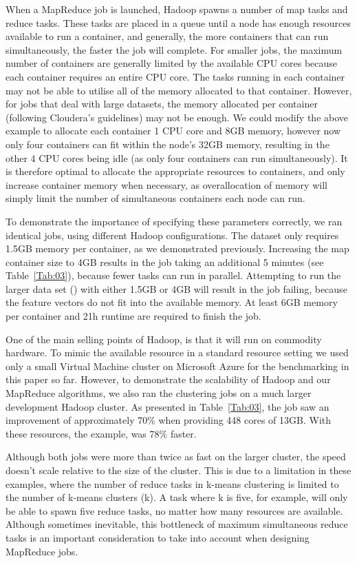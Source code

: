 \documentclass{bioinfo}
\begin{document}
When a MapReduce job is launched, Hadoop spawns a number of map tasks and reduce tasks. 
These tasks are placed in a queue until a node has enough resources available to run a container, and generally, the more containers that can run simultaneously, the faster the job will complete.
For smaller jobs, the maximum number of containers are generally limited by the available CPU cores because each container requires an entire CPU core. The tasks running in each container may not be able to utilise all of the memory allocated to that container.
However, for jobs that deal with large datasets, the memory allocated per container (following Cloudera's guidelines) may not be enough.
We could modify the above example to allocate each container 1 CPU core and 8GB memory, however now only four containers can fit within the node's 32GB memory, resulting in the other 4 CPU cores being idle (as only four containers can run simultaneously). 
It is therefore optimal to allocate the appropriate resources to containers, and only increase container memory when necessary, as overallocation of memory will simply limit the number of simultaneous containers each node can run.

To demonstrate the importance of specifying these parameters correctly, we ran identical jobs, using different Hadoop configurations. 
The \OnePhaseone{} dataset only requires 1.5GB memory per container, as we demonstrated previously.
Increasing the map container size to 4GB results in the job taking an additional 5 minutes (see Table~\ref{Tab:03}), because fewer tasks can run in parallel. 
Attempting to run the larger data set (\FullPhasethree{}) with either 1.5GB or 4GB will result in the job failing, because the feature vectors do not fit into the available memory. 
At least 6GB memory per container and 21h runtime are required to finish the job. 

One of the main selling points of Hadoop, is that it will run on commodity hardware. 
To mimic the available resource in a standard resource setting we used only a small Virtual Machine cluster on Microsoft Azure for the benchmarking in this paper so far.
However, to demonstrate the scalability of Hadoop and our MapReduce algorithms, we also ran the clustering jobs on a much larger development Hadoop cluster. 
As presented in Table~\ref{Tab:03}, the \OnePhaseone{} job saw an improvement of approximately 70\% when providing 448 cores of 13GB. 
With these resources, the \FullPhasethree{} example, was 78\% faster.

Although both jobs were more than twice as fast on the larger cluster, the speed doesn't scale relative to the size of the cluster. This is due to a limitation in these examples, where the number of reduce tasks in k-means clustering is limited to the number of k-means clusters (k).
A task where k is five, for example, will only be able to spawn five reduce tasks, no matter how many resources are available. Although sometimes inevitable, this bottleneck of maximum simultaneous reduce tasks is an important consideration to take into account when designing MapReduce jobs. 
\end{document}

